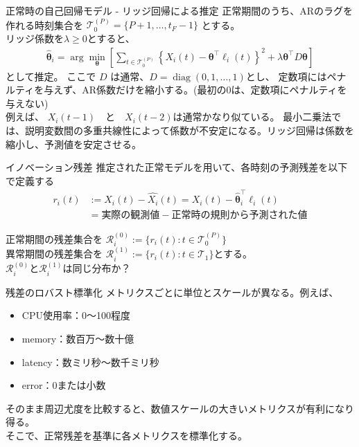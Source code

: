 \documentclass[dvipdfmx, 11pt, aspectratio=169, notheorems]{beamer}
\begin{document}
\begin{frame}{正常時の自己回帰モデル - リッジ回帰による推定}
    正常期間のうち、ARのラグを作れる時刻集合を
        $ \mathcal T_0^{(P)} = \{P+1,\ldots,t_F-1\} $
    とする。\\
    リッジ係数を$\lambda\geq 0$とすると、
    \begin{align}
        \widehat{\boldsymbol{\theta}}_i 
        = \arg\min_{\boldsymbol{\theta}} \left[ \sum_{t\in\mathcal T_0^{(P)}} \left\{
            X_i(t) - \boldsymbol{\theta}^{\top} \boldsymbol{\ell}_i(t) \right\}^{2}
            + \lambda \boldsymbol{\theta}^{\top} D \boldsymbol{\theta} \right]
    \end{align}
    として推定。 ここで \(D\) は通常、$ D = \operatorname{diag}(0,1,\ldots,1) $とし、
    定数項にはペナルティを与えず、AR係数だけを縮小する。{\scriptsize (最初の0は、定数項にペナルティを与えない)}\\
    例えば、
    $ X_i(t-1)\quad\text{と}\quad X_i(t-2) $は通常かなり似ている。
    最小二乗法では、説明変数間の多重共線性によって係数が不安定になる。リッジ回帰は係数を縮小し、予測値を安定させる。
\end{frame}

\begin{frame}{イノベーション残差}
    推定された正常モデルを用いて、各時刻の予測残差を以下で定義する
\begin{align}
    r_i(t) &:=X_i(t) - \widehat{X_i}(t) =  X_i(t) - \widehat{\boldsymbol{\theta}}_i^\top \boldsymbol{\ell}_i(t) \\
    &= \text{実際の観測値} - \text{正常時の規則から予測された値}
\end{align}

正常期間の残差集合を
$\mathcal R_i^{(0)} := \{r_i(t):t\in\mathcal T_0^{(P)}\} $\\
異常期間の残差集合を
$\mathcal R_i^{(1)} := \{r_i(t):t\in\mathcal T_1\} $とする。\\
\vspace{12pt}
\alert{$\mathcal R_i^{(0)}$と$\mathcal R_i^{(1)}$は同じ分布か？}

\end{frame}

\begin{frame}{残差のロバスト標準化}
    メトリクスごとに単位とスケールが異なる。例えば、
    \begin{itemize}
        \item CPU使用率：0～100程度
        \item memory：数百万～数十億
        \item latency：数ミリ秒～数千ミリ秒
        \item error：0または小数
    \end{itemize}
    そのまま周辺尤度を比較すると、数値スケールの大きいメトリクスが有利になり得る。\\
    そこで、正常残差を基準に各メトリクスを標準化する。
\end{frame}
\end{document}
